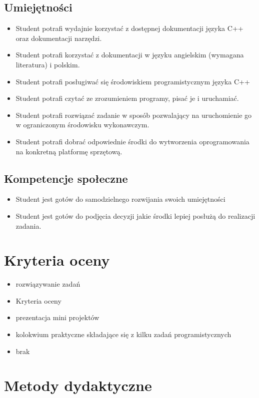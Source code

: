 \documentclass[12pt, a4paper]{article}
\begin{document}
\subsection*{Umiejętności}
\begin{itemize}
  \item Student potrafi wydajnie korzystać z dostępnej dokumentacji języka C++ oraz dokumentacji narzędzi.
  \item Student potrafi korzystać z dokumentacji w języku angielskim (wymagana literatura) i polskim.
  \item Student potrafi posługiwać się środowiskiem programistycznym języka C++
  \item Student potrafi czytać ze zrozumieniem programy, pisać je i uruchamiać.
  \item Student potrafi rozwiązać zadanie w sposób pozwalający na uruchomienie go w ograniczonym środowisku wykonawczym.
  \item Student potrafi dobrać odpowiednie środki do wytworzenia oprogramowania na konkretną platformę sprzętową.
\end{itemize}

\subsection*{Kompetencje społeczne}
\begin{itemize}
  \item Student jest gotów do samodzielnego rozwijania swoich umiejętności
  \item Student jest gotów do podjęcia decyzji jakie środki lepiej posłużą do realizacji zadania.
\end{itemize}

\section{Kryteria oceny}

\begin{itemize}
  \item rozwiązywanie zadań
  \item Kryteria oceny
  \item prezentacja mini projektów
  \item kolokwium praktyczne składające się z kilku zadań programistycznych
  \item brak
\end{itemize}

\section{Metody dydaktyczne}
\end{document}
